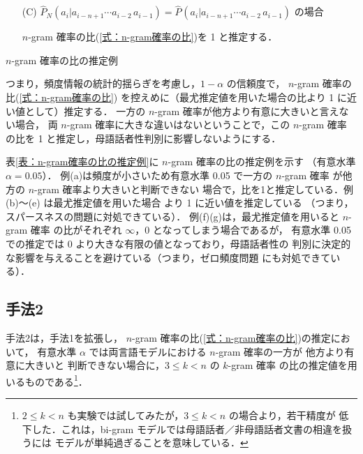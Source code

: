 \documentclass[japanese]{jnlp_1.4}
\newcommand{\NN}{}
\begin{document}
\begin{itemize}
 \item[(C)] $\widehat{P}_N(a_i|a_{i-n+1}\cdots a_{i-2}\,a_{i-1}) = 
        \widehat{P}_{\NN}(a_i|a_{i-n+1}\cdots a_{i-2}\,a_{i-1})$ の場合

	$n$-gram 確率の比(\ref{式：n-gram確率の比})を 1 と推定する．
\end{itemize}

\begin{table}[b]
\caption{$n$-gram 確率の比の推定例}
\label{表：n-gram確率の比の推定例}

\end{table}

つまり，頻度情報の統計的揺らぎを考慮し，$1-\alpha$ の信頼度で，
$n$-gram 確率の比(\ref{式：n-gram確率の比})
を控えめに（最尤推定値を用いた場合の比より 1 に近い値として）推定する．
一方の $n$-gram 確率が他方より有意に大きいと言えない場合，
両 $n$-gram 確率に大きな違いはないということで，この $n$-gram 確率
の比を 1 と推定し，母語話者性判別に影響しないようにする．


表\ref{表：n-gram確率の比の推定例}に $n$-gram 確率の比の推定例を示す
（有意水準 $\alpha=0.05$）．
例(a)は頻度が小さいため有意水準 0.05 で一方の $n$-gram 確率
が他方の $n$-gram 確率より大きいと判断できない
場合で，比を1と推定している．例(b)〜(e) は最尤推定値を用いた場合
より 1 に近い値を推定している
（つまり，スパースネスの問題に対処できている）．
例(f)(g)は，最尤推定値を用いると $n$-gram 確率
の比がそれぞれ $\infty$，$0$ となってしまう場合であるが，
有意水準 0.05 での推定では 0 より大きな有限の値となっており，母語話者性の
判別に決定的な影響を与えることを避けている（つまり，ゼロ頻度問題
にも対処できている）．


\subsection{手法2}

手法2は，手法1を拡張し，
$n$-gram 確率の比(\ref{式：n-gram確率の比})の推定において，
有意水準 $\alpha$ では両言語モデルにおける $n$-gram 確率の一方が
他方より有意に大きいと
判断できない場合に，$3\leq k<n$ の $k$-gram 確率
の比の推定値を用いるものである\footnote{
$2\leq k<n$ も実験では試してみたが，$3\leq k <n$ の場合より，若干精度が
低下した．これは，bi-gram モデルでは母語話者／非母語話者文書の相違を扱うには
モデルが単純過ぎることを意味している．
}．
\end{document}
